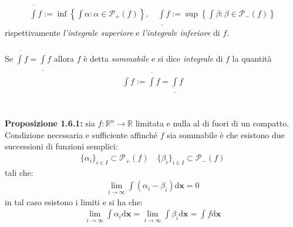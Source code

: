 \documentclass{article}
\numberwithin{equation}{subsection}
\begin{document}
\begin{gather*}
    \overline{\int} f := \inf \left\{ \int \alpha : \alpha \in \mathcal{P}_+(f) \right\}, \quad \underline{\int} f := \sup \left\{ \int \beta : \beta \in \mathcal{P}_-(f) \right\} 
\end{gather*}
rispettivamente \textit{l'integrale superiore} e \textit{l'integrale inferiore} di $f$. \\ \\
Se $\overline{\int} f = \underline{\int} f$ allora $f$ è detta \textit{sommabile} e si dice \textit{integrale} di $f$ la quantità
\begin{gather*}
    \int f := \overline{\int} f = \underline{\int} f 
\end{gather*} \\ \\
\textbf{Proposizione 1.6.1:} sia $f : \mathbb{R}^n \longrightarrow \mathbb{R}$ limitata e nulla al di fuori di un compatto. Condizione necessaria e sufficiente affinché $f$ sia sommabile è che esistono due successioni di funzioni semplici:
\begin{gather*}
    \{ \alpha_i \}_{i \in I} \subset \mathcal{P}_+(f) \quad \{ \beta_i \}_{i \in I} \subset \mathcal{P}_-(f) 
\end{gather*}
tali che:
\begin{gather*}
    \lim_{i \rightarrow \infty} \int (\alpha_i - \beta_i) \mathrm{d}\mathbf{x} = 0 
\end{gather*}
in tal caso esistono i limiti e si ha che:
\begin{gather*}
    \lim_{i \rightarrow \infty} \int \alpha_i \mathrm{d} \mathbf{x} =  \lim_{i \rightarrow \infty} \int \beta_i \mathrm{d} \mathbf{x} = \int f \mathrm{d} \mathbf{x} 
\end{gather*} \\
\end{document}
